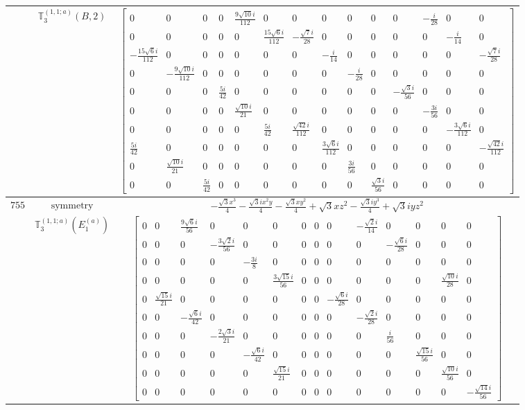 \documentclass[fleqn,8pt,landscape]{jsarticle}
\begin{document}
\begin{longtable}{ccc}
$  $ & $ \mathbb{T}_{3}^{(1,1;a)}(B,2) $ & $ \begin{bmatrix} 0 & 0 & 0 & 0 & \frac{9 \sqrt{10} i}{112} & 0 & 0 & 0 & 0 & 0 & 0 & - \frac{i}{28} & 0 & 0 \\ 0 & 0 & 0 & 0 & 0 & \frac{15 \sqrt{6} i}{112} & - \frac{\sqrt{7} i}{28} & 0 & 0 & 0 & 0 & 0 & - \frac{i}{14} & 0 \\ - \frac{15 \sqrt{6} i}{112} & 0 & 0 & 0 & 0 & 0 & 0 & - \frac{i}{14} & 0 & 0 & 0 & 0 & 0 & - \frac{\sqrt{7} i}{28} \\ 0 & - \frac{9 \sqrt{10} i}{112} & 0 & 0 & 0 & 0 & 0 & 0 & - \frac{i}{28} & 0 & 0 & 0 & 0 & 0 \\ 0 & 0 & 0 & \frac{5 i}{42} & 0 & 0 & 0 & 0 & 0 & 0 & - \frac{\sqrt{3} i}{56} & 0 & 0 & 0 \\ 0 & 0 & 0 & 0 & \frac{\sqrt{10} i}{21} & 0 & 0 & 0 & 0 & 0 & 0 & - \frac{3 i}{56} & 0 & 0 \\ 0 & 0 & 0 & 0 & 0 & \frac{5 i}{42} & \frac{\sqrt{42} i}{112} & 0 & 0 & 0 & 0 & 0 & - \frac{3 \sqrt{6} i}{112} & 0 \\ \frac{5 i}{42} & 0 & 0 & 0 & 0 & 0 & 0 & \frac{3 \sqrt{6} i}{112} & 0 & 0 & 0 & 0 & 0 & - \frac{\sqrt{42} i}{112} \\ 0 & \frac{\sqrt{10} i}{21} & 0 & 0 & 0 & 0 & 0 & 0 & \frac{3 i}{56} & 0 & 0 & 0 & 0 & 0 \\ 0 & 0 & \frac{5 i}{42} & 0 & 0 & 0 & 0 & 0 & 0 & \frac{\sqrt{3} i}{56} & 0 & 0 & 0 & 0 \end{bmatrix} $ \\ \hline
$ 755 $ & $ \text{symmetry} $ & $ - \frac{\sqrt{3} x^{3}}{4} - \frac{\sqrt{3} i x^{2} y}{4} - \frac{\sqrt{3} x y^{2}}{4} + \sqrt{3} x z^{2} - \frac{\sqrt{3} i y^{3}}{4} + \sqrt{3} i y z^{2} $ \\
$  $ & $ \mathbb{T}_{3}^{(1,1;a)}(E_{1}^{(a)}) $ & $ \begin{bmatrix} 0 & 0 & \frac{9 \sqrt{6} i}{56} & 0 & 0 & 0 & 0 & 0 & 0 & - \frac{\sqrt{2} i}{14} & 0 & 0 & 0 & 0 \\ 0 & 0 & 0 & - \frac{3 \sqrt{2} i}{56} & 0 & 0 & 0 & 0 & 0 & 0 & - \frac{\sqrt{6} i}{28} & 0 & 0 & 0 \\ 0 & 0 & 0 & 0 & - \frac{3 i}{8} & 0 & 0 & 0 & 0 & 0 & 0 & 0 & 0 & 0 \\ 0 & 0 & 0 & 0 & 0 & \frac{3 \sqrt{15} i}{56} & 0 & 0 & 0 & 0 & 0 & 0 & \frac{\sqrt{10} i}{28} & 0 \\ 0 & \frac{\sqrt{15} i}{21} & 0 & 0 & 0 & 0 & 0 & 0 & - \frac{\sqrt{6} i}{28} & 0 & 0 & 0 & 0 & 0 \\ 0 & 0 & - \frac{\sqrt{6} i}{42} & 0 & 0 & 0 & 0 & 0 & 0 & - \frac{\sqrt{2} i}{28} & 0 & 0 & 0 & 0 \\ 0 & 0 & 0 & - \frac{2 \sqrt{3} i}{21} & 0 & 0 & 0 & 0 & 0 & 0 & \frac{i}{56} & 0 & 0 & 0 \\ 0 & 0 & 0 & 0 & - \frac{\sqrt{6} i}{42} & 0 & 0 & 0 & 0 & 0 & 0 & \frac{\sqrt{15} i}{56} & 0 & 0 \\ 0 & 0 & 0 & 0 & 0 & \frac{\sqrt{15} i}{21} & 0 & 0 & 0 & 0 & 0 & 0 & \frac{\sqrt{10} i}{56} & 0 \\ 0 & 0 & 0 & 0 & 0 & 0 & 0 & 0 & 0 & 0 & 0 & 0 & 0 & - \frac{\sqrt{14} i}{56} \end{bmatrix} $ \\ \hline

\end{longtable}
\end{document}
